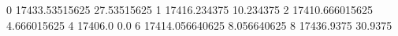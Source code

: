 0 17433.53515625 27.53515625
1 17416.234375 10.234375
2 17410.666015625 4.666015625
4 17406.0 0.0
6 17414.056640625 8.056640625
8 17436.9375 30.9375
